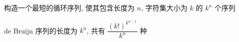 构造一个最短的循环序列, 使其包含长度为 \(n\), 字符集大小为 \(k\) 的 \(k^n\) 个序列

de Bruijn 序列的长度为 \(k^n\), 共有 \(\dfrac{\left(k!\right)^{k^{n-1}}}{k^n}\) 种
